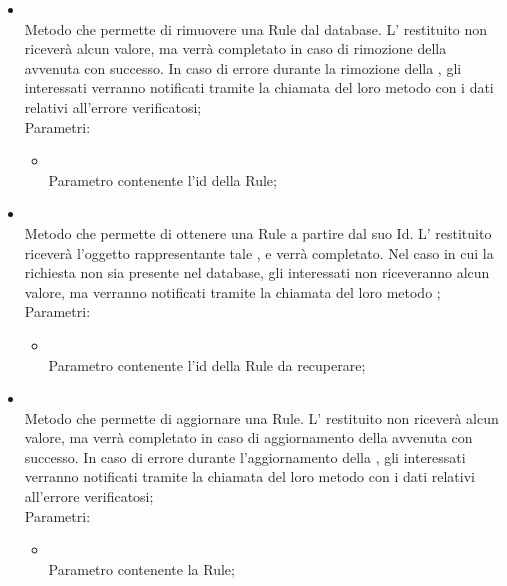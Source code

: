 \begin{itemize}
\begin{itemize}
		\item[]  \\
		Metodo che permette di rimuovere una Rule dal database. L' restituito non riceverà alcun valore, ma verrà completato in caso di rimozione della  avvenuta con successo. In caso di errore durante la rimozione della , gli  interessati verranno notificati tramite la chiamata del loro metodo  con i dati relativi all'errore verificatosi;\\
		Parametri:
		\begin{itemize}
			\item {} \\
			Parametro contenente l'id della Rule;
		\end{itemize}
		\item[]  \\
		Metodo che permette di ottenere una Rule a partire dal suo Id. L' restituito riceverà l'oggetto rappresentante tale , e verrà completato. Nel caso in cui la  richiesta non sia presente nel database, gli  interessati non riceveranno alcun valore, ma verranno notificati tramite la chiamata del loro metodo ;\\
		Parametri:
		\begin{itemize}
			\item {} \\
			Parametro contenente l'id della Rule da recuperare;
		\end{itemize}
		\item[]  \\
		Metodo che permette di aggiornare una Rule.  L' restituito non riceverà alcun valore, ma verrà completato in caso di aggiornamento della  avvenuta con successo. In caso di errore durante l'aggiornamento della , gli  interessati verranno notificati tramite la chiamata del loro metodo  con i dati relativi all'errore verificatosi;\\
		Parametri:
		\begin{itemize}
			\item {} \\
			Parametro contenente la Rule;
		\end{itemize}
	\end{itemize}
\end{itemize}

